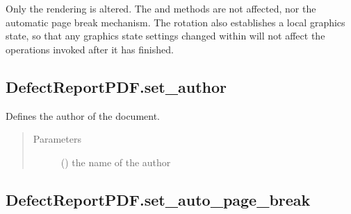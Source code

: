 \documentclass[letterpaper,10pt,english]{sphinxmanual}
\begin{document}
\begin{fulllineitems}
\begin{fulllineitems}
\sphinxAtStartPar
Only the rendering is altered. The  and  methods are
not affected, nor the automatic page break mechanism.
The rotation also establishes a local graphics state, so that any
graphics state settings changed within will not affect the operations
invoked after it has finished.

\end{fulllineitems}



\subsection{DefectReportPDF.set\_author}
\label{\detokenize{generated/quality_assessment.quality_pdf_report.DefectReportPDF.set_author:defectreportpdf-set-author}}\label{\detokenize{generated/quality_assessment.quality_pdf_report.DefectReportPDF.set_author::doc}}

\begin{fulllineitems}
\label{\detokenize{generated/quality_assessment.quality_pdf_report.DefectReportPDF.set_author:quality_assessment.quality_pdf_report.DefectReportPDF.set_author}}
\sphinxAtStartPar
Defines the author of the document.
\begin{quote}\begin{description}
\item[{Parameters}] \leavevmode
\sphinxAtStartPar
{} () \textendash{} the name of the author

\end{description}\end{quote}

\end{fulllineitems}



\subsection{DefectReportPDF.set\_auto\_page\_break}
\label{\detokenize{generated/quality_assessment.quality_pdf_report.DefectReportPDF.set_auto_page_break:defectreportpdf-set-auto-page-break}}\label{\detokenize{generated/quality_assessment.quality_pdf_report.DefectReportPDF.set_auto_page_break::doc}}


\end{fulllineitems}
\end{document}
